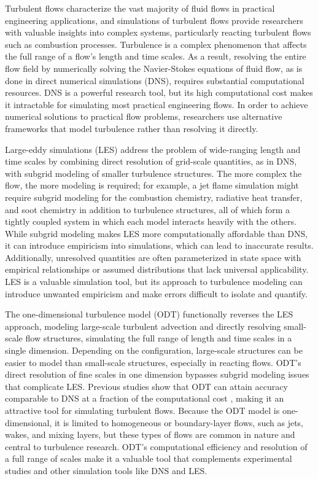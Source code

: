 \documentclass[preprint,12pt, a4paper]{elsarticle}
\begin{document}
Turbulent flows characterize the vast majority of fluid flows in practical engineering applications, and simulations of turbulent flows provide researchers with valuable insights into complex systems, particularly reacting turbulent flows such as combustion processes. Turbulence is a complex phenomenon that affects the full range of a flow's length and time scales. As a result, resolving the entire flow field by numerically solving the Navier-Stokes equations of fluid flow, as is done in direct numerical simulations (DNS), requires substantial computational resources. DNS is a powerful research tool, but its high computational cost makes it intractable for simulating most practical engineering flows. In order to achieve numerical solutions to practical flow problems, researchers use alternative frameworks that model turbulence rather than resolving it directly.

Large-eddy simulations (LES) address the problem of wide-ranging length and time scales by combining  direct resolution of grid-scale quantities, as in DNS, with subgrid modeling of smaller turbulence structures. The more complex the flow, the more modeling is required; for example, a jet flame simulation might require subgrid modeling for the combustion chemistry, radiative heat transfer, and soot chemistry in addition to turbulence structures, all of which form a tightly coupled system in which each model interacts heavily with the others. While subgrid modeling makes LES more computationally affordable than DNS, it can introduce empiricism into simulations, which can lead to inaccurate results. Additionally, unresolved quantities are often parameterized in state space with empirical relationships or assumed distributions that lack universal applicability. LES is a valuable simulation tool, but its approach to turbulence modeling can introduce unwanted empiricism and make errors difficult to isolate and quantify.

The one-dimensional turbulence model (ODT) functionally reverses the LES approach, modeling large-scale turbulent advection and directly resolving small-scale flow structures, simulating the full range of length and time scales in a single dimension. Depending on the configuration, large-scale structures can be easier to model than small-scale structures, especially in reacting flows. ODT's direct resolution of fine scales in one dimension bypasses subgrid modeling issues that complicate LES. Previous studies show that ODT can attain accuracy comparable to DNS at a fraction of the computational cost \cite{Lignell_2015,Abboud_2015}, making it an attractive tool for simulating turbulent flows. Because the ODT model is one-dimensional, it is limited to homogeneous or boundary-layer flows, such as jets, wakes, and mixing layers, but these types of flows are common in nature and central to turbulence research. ODT's computational efficiency and resolution of a full range of scales make it a valuable tool that complements experimental studies and other simulation tools like DNS and LES. 
\end{document}
